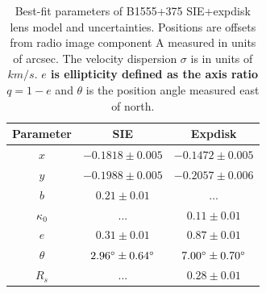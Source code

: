 \documentclass[useAMS,usenatbib]{mnras}
\begin{document}
\begin{table}
 \centering
  \caption{Best-fit parameters of B1555+375 SIE+expdisk lens model and uncertainties. Positions are offsets from radio image component A measured in units of arcsec. The velocity dispersion $\sigma$ is in units of $km/s$. \textbf{$e$ is ellipticity defined as the axis ratio $q=1-e$ }and $\theta$ is the position angle measured east of north.}
  \begin{tabular}{@{}ccc}
\hline 
 Parameter  & SIE & Expdisk 		   
\\
\hline
$x$  	  & $-0.1818 \pm 0.005$	&$-0.1472 \pm 0.005$ 	  \\
$y$	  &$-0.1988 \pm 0.005$	&$-0.2057 \pm 0.006$	 \\

$b$ &$0.21 \pm 0.01$  & ...   \\
$\kappa_0$ & ... & $0.11 \pm 0.01$        \\  
$e$	  & $0.31\pm 0.01$	&$0.87 \pm 0.01$ \\
$\theta$ &$2.96 \hbox{$^\circ$} \pm 0.64 \hbox{$^\circ$}$ &$7.00\hbox{$^\circ$} \pm 0.70 \hbox{$^\circ$}$ \\
$R_s$	& ...  & $0.28 \pm 0.01$\\
\hline
\end{tabular}

\end{table}


\end{document}
